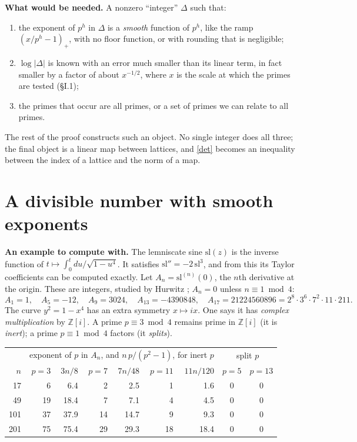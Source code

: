 \documentclass[11pt,letterpaper]{article}
\newcommand{\Z}{\mathbb Z}\newcommand{\Q}{\mathbb Q}\newcommand{\C}{\mathbb C}
\begin{document}
\textbf{What would be needed.} A nonzero ``integer'' $\Delta$ such that:
\begin{enumerate}[label=(W\arabic*),leftmargin=3em]
\item the exponent of $p^h$ in $\Delta$ is a \emph{smooth} function of $p^h$, like the ramp $(x/p^h-1)_+$,
with no floor function, or with rounding that is negligible;
\item $\log|\Delta|$ is known with an error much smaller than its linear term, in fact smaller by a factor
of about $x^{-1/2}$, where $x$ is the scale at which the primes are tested (\S I.1);
\item the primes that occur are all primes, or a set of primes we can relate to all primes.
\end{enumerate}
The rest of the proof constructs such an object. No single integer does all three; the final object is a
linear map between lattices, and \eqref{det} becomes an inequality between the index of a lattice and the
norm of a map.

\section{A divisible number with smooth exponents}

\textbf{An example to compute with.} The lemniscate sine $\mathrm{sl}(z)$ is the inverse function of
$t\mapsto\int_0^t du/\sqrt{1-u^4}$. It satisfies $\mathrm{sl}''=-2\,\mathrm{sl}^3$, and from this its Taylor
coefficients can be computed exactly. Let $A_n=\mathrm{sl}^{(n)}(0)$, the $n$th derivative at the origin.
These are integers, studied by Hurwitz \cite{Hur99}; $A_n=0$ unless $n\equiv1\bmod4$:
\begin{equation}\label{D:8}
 A_1=1,\quad A_5=-12,\quad A_9=3024,\quad A_{13}=-4390848,\quad
 A_{17}=21224560896=2^8\cdot3^6\cdot7^2\cdot11\cdot211 .
\end{equation}
The curve $y^2=1-x^4$ has an extra symmetry $x\mapsto ix$. One says it has \emph{complex multiplication} by
$\Z[i]$. A prime $p\equiv3\bmod4$ remains prime in $\Z[i]$ (it is \emph{inert}); a prime $p\equiv1\bmod4$
factors (it \emph{splits}).

\begin{center}\small
\begin{tabular}{r|rr|rr|rr||cc}
\toprule
 & \multicolumn{6}{c||}{exponent of $p$ in $A_n$, and $n\,p/(p^2-1)$, for inert $p$}&\multicolumn{2}{c}{split $p$}\\
$n$ & $p=3$ & $3n/8$ & $p=7$ & $7n/48$ & $p=11$ & $11n/120$ & $p=5$ & $p=13$\\
\midrule
17 & 6 & 6.4 & 2 & 2.5 & 1 & 1.6 & 0 & 0\\
49 & 19 & 18.4 & 7 & 7.1 & 4 & 4.5 & 0 & 0\\
101 & 37 & 37.9 & 14 & 14.7 & 9 & 9.3 & 0 & 0\\
201 & 75 & 75.4 & 29 & 29.3 & 18 & 18.4 & 0 & 0\\
\bottomrule
\end{tabular}
\end{center}
\end{document}
